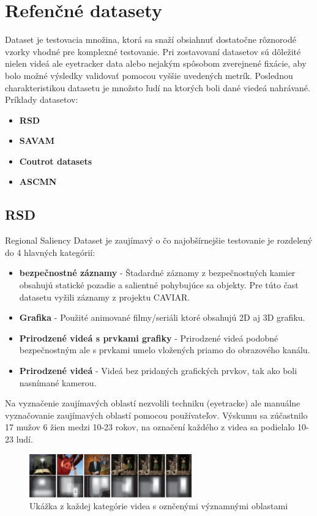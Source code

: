 \section{Refenčné datasety}
Dataset je testovacia množina, ktorá sa snaží obsiahnuť dostatočne rôznorodé vzorky vhodné pre komplexné testovanie.
Pri zostavovaní datasetov sú dôležité nielen videá ale eyetracker data alebo nejakým spôsobom zverejnené fixácie, aby bolo možné výsledky validovať pomocou vyššie uvedených metrík.
Poslednou charakteristikou datasetu je množsto ľudí na ktorých boli dané viedeá nahrávané.
\\ Príklady datasetov:
\begin{itemize}
	\item \textbf{RSD}\cite{rsd}
	\item \textbf{SAVAM}\cite{savam}
	\item \textbf{Coutrot datasets}\cite{courot-dataset}
  \item \textbf{ASCMN}\cite{accv}
\end{itemize}

\subsection{RSD}
Regional Saliency Dataset je zaujímavý o čo najobšírnejšie testovanie je rozdelený do 4 hlavných kategórií: \\
\begin{itemize}
	\item \textbf{bezpečnostné záznamy} - Štadardné záznamy z bezpečnostných kamier obsahujú statické pozadie a salientné pohybujúce sa objekty.
Pre túto čast datasetu vyžili záznamy z projektu CAVIAR\cite{rsd-caviar}.
	\item \textbf{Grafika} - Použité animované filmy/seriáli ktoré obsahujú 2D aj 3D grafiku.
  \item \textbf{Prirodzené videá s prvkami grafiky} - Prirodzené videá  podobné bezpečnostným ale s prvkami umelo vložených priamo do obrazového kanálu.
  \item \textbf{Prirodzené videá} - Videá bez pridaných grafických prvkov, tak ako boli nasnímané kamerou.
\end{itemize}

Na vyznačenie zaujímavých oblastí nezvolili techniku (eyetracke) ale manuálne vyznačovanie zaujímavých oblastí pomocou používateľov.
Výskumu sa zúčastnilo 17 mužov 6 žien medzi 10-23 rokov, na označení každého z videa sa podielalo 10-23 ludí.

\begin{figure}[H]
 \centering
 \includegraphics[width=7cm]{pics/rsd.png}
 \caption{Ukážka z každej kategórie videa s oznčenými významnými oblastami}
\end{figure}
\vspace{10mm}


